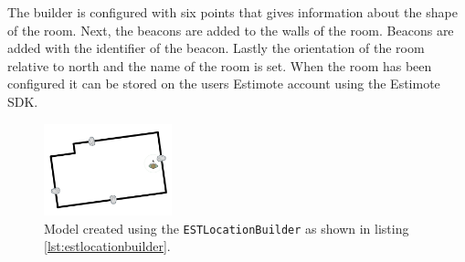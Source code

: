 The builder is configured with six points that gives information about the shape of the room. Next, the beacons are added to the walls of the room. Beacons are added with the identifier of the beacon. Lastly the orientation of the room relative to north and the name of the room is set. When the room has been configured it can be stored on the users Estimote account using the Estimote SDK.

\begin{figure}
\centering
\includegraphics[width=0.33\textwidth]{images/living-room}
\caption{Model created using the \texttt{ESTLocationBuilder} as shown in listing \ref{lst:estlocationbuilder}.}
\label{fig:estlocationbuilder-livingroom}
\end{figure}

